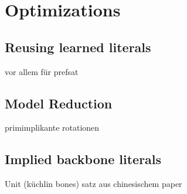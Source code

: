 \section{Optimizations}
\subsection{Reusing learned literals}
	vor allem für prefsat
\subsection{Model Reduction}
	primimplikante
	rotationen
\subsection{Implied backbone literals}
	Unit (küchlin bones)
	satz aus chinesischem paper